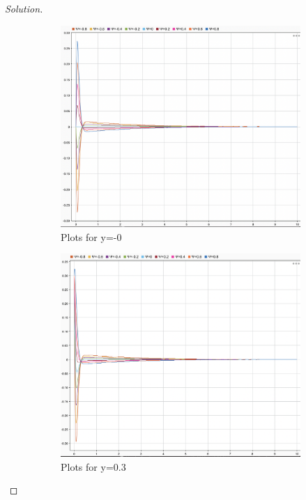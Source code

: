 \documentclass{article}
\begin{document}
\begin{proof}[Solution]
\begin{figure}
    \begin{subfigure}{0.4\linewidth}
        \includegraphics[width=\linewidth]{img9.png}
        \caption{Plots for y=-0}
      \end{subfigure}
      \begin{subfigure}{0.4\linewidth}
        \includegraphics[width=\linewidth]{img10.png}
        \caption{Plots for y=0.3}
      \end{subfigure}
      \begin{subfigure}{0.4\linewidth}

\end{subfigure}
\end{figure}
\end{proof}
\end{document}
